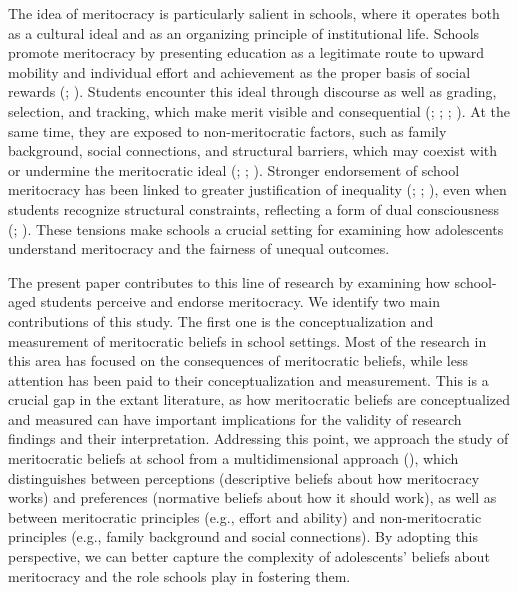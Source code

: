 \documentclass[
  13pt,
]{article}
\begin{document}
The idea of meritocracy is particularly salient in schools, where it
operates both as a cultural ideal and as an organizing principle of
institutional life. Schools promote meritocracy by presenting education
as a legitimate route to upward mobility and individual effort and
achievement as the proper basis of social rewards
(;
).
Students encounter this ideal through discourse as well as grading,
selection, and tracking, which make merit visible and consequential
(;
;
;
). At the same
time, they are exposed to non-meritocratic factors, such as family
background, social connections, and structural barriers, which may
coexist with or undermine the meritocratic ideal
(;
;
). Stronger endorsement
of school meritocracy has been linked to greater justification of
inequality (;
;
), even
when students recognize structural constraints, reflecting a form of
dual consciousness (;
). These
tensions make schools a crucial setting for examining how adolescents
understand meritocracy and the fairness of unequal outcomes.

The present paper contributes to this line of research by examining how
school-aged students perceive and endorse meritocracy. We identify two
main contributions of this study. The first one is the conceptualization
and measurement of meritocratic beliefs in school settings. Most of the
research in this area has focused on the consequences of meritocratic
beliefs, while less attention has been paid to their conceptualization
and measurement. This is a crucial gap in the extant literature, as how
meritocratic beliefs are conceptualized and measured can have important
implications for the validity of research findings and their
interpretation. Addressing this point, we approach the study of
meritocratic beliefs at school from a multidimensional approach
(),
which distinguishes between perceptions (descriptive beliefs about how
meritocracy works) and preferences (normative beliefs about how it
should work), as well as between meritocratic principles (e.g., effort
and ability) and non-meritocratic principles (e.g., family background
and social connections). By adopting this perspective, we can better
capture the complexity of adolescents' beliefs about meritocracy and the
role schools play in fostering them.
\end{document}
